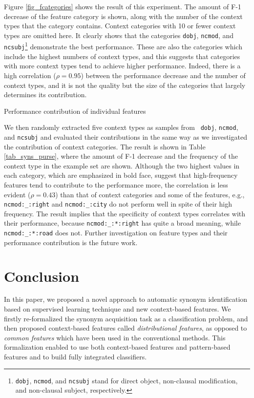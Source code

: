 \documentclass[english]{jnlp_1.4}
\begin{document}
Figure \ref{fig_fcategories} shows the result of this experiment. The
amount of F-1 decrease of the feature category is shown, along with
the number of the context types that the category contains. Context
categories with 10 or fewer context types are omitted here. It clearly
shows that the categories {\tt dobj}, {\tt ncmod}, and {\tt
ncsubj}\footnote{{\tt dobj}, {\tt ncmod}, and {\tt ncsubj} stand for
direct object, non-clausal modification, and non-clausal subject,
respectively.} demonstrate the best performance. These are also the
categories which include the highest numbers of context types, and
this suggests that categories with more context types tend to achieve
higher performance. Indeed, there is a high correlation ($\rho =
0.95$) between the performance decrease and the number of context
types, and it is not the quality but the size of the categories that
largely determines its contribution.


\begin{table}[t]
\caption{Performance contribution of individual features}
\label{tab_syns_purse}

\end{table}

We then randomly extracted five context types as samples from {\tt
dobj}, {\tt ncmod}, and {\tt ncsubj} and evaluated their contributions
in the same way as we investigated the contribution of context
categories. The result is shown in Table \ref{tab_syns_purse}, where
the amount of F-1 decrease and the frequency of the context type in
the example set are shown. Although the two highest values in each
category, which are emphasized in bold face, suggest that
high-frequency features tend to contribute to the performance more,
the correlation is less evident ($\rho = 0.43$) than that of context
categories and some of the features, e.g., {\tt ncmod:\_:right} and
{\tt ncmod:\_:city} do not perform well in spite of their high
frequency. The result implies that the specificity of context types
correlates with their performance, because {\tt ncmod:\_:*:right} has
quite a broad meaning, while {\tt ncmod:\_:*:road} does not. Further
investigation on feature types and their performance contribution is
the future work.



\section{Conclusion}

In this paper, we proposed a novel approach to automatic synonym
identification based on supervised learning technique and new
context-based features. We firstly re-formalized the synonym
acquisition task as a classification problem, and then proposed
context-based features called \textit{distributional features}, as
opposed to \textit{common features} which have been used in the
conventional methods. This formalization enabled to use both
context-based features and pattern-based features and to build fully
integrated classifiers.
\end{document}
